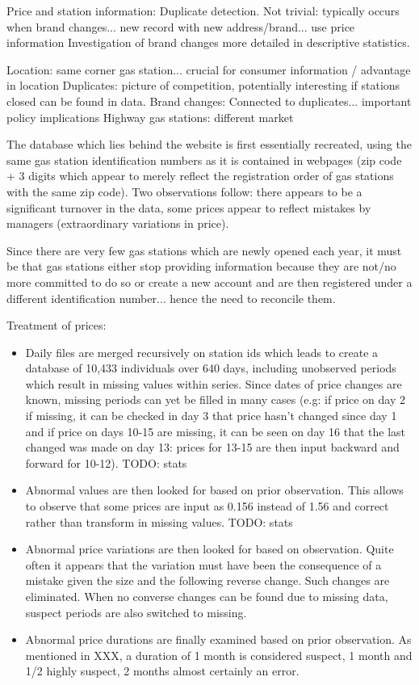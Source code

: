 \documentclass[11pt]{article}
\begin{document}
Price and station information: Duplicate detection. Not trivial: typically occurs when brand changes... new record with new address/brand... use price information
Investigation of brand changes more detailed in descriptive statistics.

Location: same corner gas station... crucial for consumer information / advantage in location
Duplicates: picture of competition, potentially interesting if stations closed can be found in data.
Brand changes: Connected to duplicates... important policy implications
Highway gas stations: different market

The database which lies behind the website is first essentially recreated, using the same gas station identification numbers as it is contained in webpages (zip code + 3 digits which appear to merely reflect the registration order of gas stations with the same zip code). Two observations follow: there appears to be a significant turnover in the data, some prices appear to reflect mistakes by managers (extraordinary variations in price).

Since there are very few gas stations which are newly opened each year, it must be that gas stations either stop providing information because they are not/no more committed to do so or create a new account and are then registered under a different identification number... hence the need to reconcile them.

Treatment of prices:
\begin{itemize}
\item Daily files are merged recursively on station ids which leads to create a database of 10,433 individuals over 640 days, including unobserved periods which result in missing values within series. Since dates of price changes are known, missing periods can yet be filled in many cases (e.g: if price on day 2 if missing, it can be checked in day 3 that price hasn't changed since day 1 and if price on days 10-15 are missing, it can be seen on day 16 that the last changed was made on day 13: prices for 13-15 are then input backward and forward for 10-12). TODO: stats
\item Abnormal values are then looked for based on prior observation. This allows to observe that some prices are input as 0.156 instead of 1.56 and correct rather than transform in missing values. TODO: stats
\item Abnormal price variations are then looked for based on observation. Quite often it appears that the variation must have been the consequence of a mistake given the size and the following reverse change. Such changes are eliminated. When no converse changes can be found due to missing data, suspect periods are also switched to missing.
\item Abnormal price durations are finally examined based on prior observation. As mentioned in XXX, a duration of 1 month is considered suspect, 1 month and 1/2 highly suspect, 2 months almost certainly an error.
\end{itemize}
\end{document}
